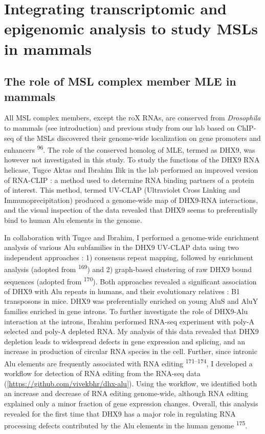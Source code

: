 \documentclass[11pt,twoside]{MPIthesis}
\theoremstyle{definition}
\theoremstyle{definition}
\theoremstyle{definition}
\theoremstyle{remark}
\begin{document}
\section{Integrating transcriptomic and epigenomic analysis to study
MSLs in
mammals}\label{integrating-transcriptomic-and-epigenomic-analysis-to-study-msls-in-mammals}

\subsection{The role of MSL complex member MLE in
mammals}\label{the-role-of-msl-complex-member-mle-in-mammals}

All MSL complex members, except the roX RNAs, are conserved from
\emph{Drosophila} to mammals (see introduction) and previous study from
our lab based on ChIP-seq of the MSLs discovered their genome-wide
localization on gene promoters and enhancers \textsuperscript{96}. The
role of the conserved homolog of MLE, termed as DHX9, was however not
investigated in this study. To study the functions of the DHX9 RNA
helicase, Tugce Aktas and Ibrahim Ilik in the lab performed an improved
version of RNA-CLIP : a method used to determine RNA binding partners of
a protein of interest. This method, termed UV-CLAP (Ultraviolet Cross
Linking and Immunoprecipitation) produced a genome-wide map of DHX9-RNA
interactions, and the visual inspection of the data revealed that DHX9
seems to preferentially bind to human Alu elements in the genome.

In collaboration with Tugce and Ibrahim, I performed a genome-wide
enrichment analysis of various Alu subfamilies in the DHX9 UV-CLAP data
using two independent approaches : 1) consensus repeat mapping, followed
by enrichment analysis (adopted from \textsuperscript{169}) and 2)
graph-based clustering of raw DHX9 bound sequences (adopted from
\textsuperscript{170}). Both approaches revealed a significant
association of DHX9 with Alu repeats in humans, and their evolutionary
relatives : B1 transposons in mice. DHX9 was preferentially enriched on
young AluS and AluY families enriched in gene introns. To further
investigate the role of DHX9-Alu interaction at the introns, Ibrahim
performed RNA-seq experiment with poly-A selected and poly-A depleted
RNA. My analysis of this data revealed that DHX9 depletion leads to
widespread defects in gene expression and splicing, and an increase in
production of circular RNA species in the cell. Further, since intronic
Alu elements are frequently associated with RNA editing
\textsuperscript{171--174}, I developed a workflow for detection of RNA
editing from the RNA-seq data
({[}{\url{https://github.com/vivekbhr/dhx-alu}}{]}). Using the workflow,
we identified both an increase and decrease of RNA editing genome-wide,
although RNA editing explained only a minor fraction of gene expression
changes. Overall, this analysis revealed for the first time that DHX9
has a major role in regulating RNA processing defects contributed by the
Alu elements in the human genome \textsuperscript{175}.
\end{document}
